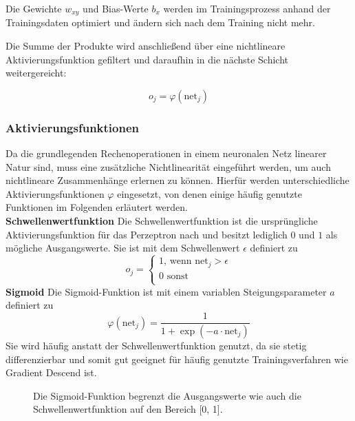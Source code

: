 		Die Gewichte $w_{xy}$ und Bias-Werte $b_x$ werden im Trainingsprozess anhand der Trainingsdaten optimiert und ändern sich nach dem Training nicht mehr.
		
		
		Die Summe der Produkte wird anschließend über eine nichtlineare Aktivierungsfunktion gefiltert und daraufhin in die nächste Schicht weitergereicht:
		
		\begin{equation}
		\label{eq:perceptron_act}
		o_j = \varphi\left(\text{net}_j\right)
		\end{equation}
		
		
		 
		\subsubsection { Aktivierungsfunktionen }
		Da die grundlegenden Rechenoperationen in einem neuronalen Netz linearer Natur sind, muss eine zusätzliche Nichtlinearität eingeführt werden, um auch nichtlineare Zusammenhänge erlernen zu können. 
		Hierfür werden unterschiedliche Aktivierungsfunktionen $\varphi$ eingesetzt, von denen einige häufig genutzte Funktionen im Folgenden erläutert werden.\\
		
		
		\textbf{Schwellenwertfunktion}
		Die Schwellenwertfunktion ist die ursprüngliche Aktivierungsfunktion für das Perzeptron nach \cite{McCulloch1943} und besitzt lediglich $0$ und $1$ als mögliche Ausgangswerte. Sie ist mit dem Schwellenwert $\epsilon$ definiert zu 
		\begin{equation}
		\label{eq:acti_sw}
		o_j = \left\{
		\begin{array}{ll}
		1\text{, wenn } \text{net}_j > \epsilon \\
		0 \text{ sonst}\\
		\end{array}
		\right.
		\end{equation}
		\textbf{Sigmoid}
			Die Sigmoid-Funktion ist mit einem variablen Steigungsparameter $a$ definiert zu 
			\begin{equation}
			\varphi\left(\text{net}_j\right) = \frac{1}{1+\exp(-a \cdot \text{net}_j)}
			\end{equation}
			Sie wird häufig anstatt der Schwellenwertfunktion genutzt, da sie stetig differenzierbar und somit gut geeignet für häufig genutzte Trainingsverfahren wie Gradient Descend ist.\\
			\begin{figure}[ht]
				\centering
				\caption{Die Sigmoid-Funktion begrenzt die Ausgangswerte wie auch die Schwellenwertfunktion auf den Bereich [0, 1].}
				\label{fig:sigmoid_plot}
			\end{figure}


